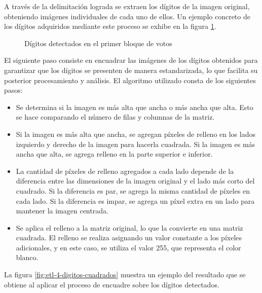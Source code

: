 A través de la delimitación lograda se extraen los dígitos de la imagen original, obteniendo imágenes individuales de
cada uno de ellos. Un ejemplo concreto de los dígitos adquiridos mediante este proceso se exhibe en la figura
\ref{fig:etl-4-digitos}.

\begin{figure}[H]
    \centering
    \caption[Dígitos detectados en el primer bloque de votos]{Dígitos detectados en el primer bloque de votos}
    \label{fig:etl-4-digitos}
\end{figure}

El siguiente paso consiste en encuadrar las imágenes de los dígitos obtenidos para garantizar que los dígitos se
presenten de manera estandarizada, lo que facilita su posterior procesamiento y análisis. El algoritmo utilizado consta
de los siguientes pasos:

\begin{itemize}
    \item Se determina si la imagen es más alta que ancha o más ancha que alta. Esto se hace comparando el número de filas y
          columnas de la matriz.
    \item Si la imagen es más alta que ancha, se agregan píxeles de relleno en los lados izquierdo y derecho de la imagen para
          hacerla cuadrada. Si la imagen es más ancha que alta, se agrega relleno en la parte superior e inferior.
    \item La cantidad de píxeles de relleno agregados a cada lado depende de la diferencia entre las dimensiones de la imagen
          original y el lado más corto del cuadrado. Si la diferencia es par, se agrega la misma cantidad de píxeles en cada
          lado. Si la diferencia es impar, se agrega un píxel extra en un lado para mantener la imagen centrada.
    \item Se aplica el relleno a la matriz original, lo que la convierte en una matriz cuadrada. El relleno se realiza asignando
          un valor constante a los píxeles adicionales, y en este caso, se utiliza el valor 255, que representa el color blanco.
\end{itemize}

\noindent
La figura \ref{fig:etl-4-digitos-cuadrados} muestra un ejemplo del resultado que se obtiene al aplicar el proceso de encuadre
sobre los dígitos detectados.

